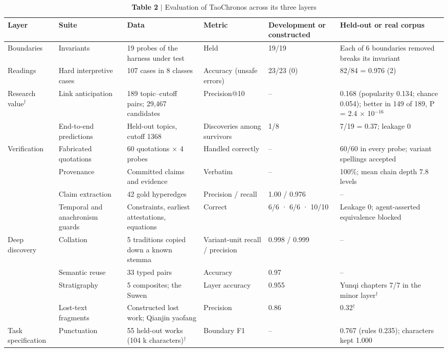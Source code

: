 \begin{table}[t]
\small
\caption{\textbf{Table 2} $|$ Evaluation of TaoChronos across its three layers}
\begin{tabular}{llllll}
\toprule
Layer & Suite & Data & Metric & Development or constructed & Held-out or real corpus \\
\midrule
Boundaries & Invariants & 19 probes of the harness under test & Held & 19/19 & Each of 6 boundaries removed breaks its invariant \\
Readings & Hard interpretive cases & 107 cases in 8 classes & Accuracy (unsafe errors) & 23/23 (0) & 82/84 = 0.976 (2) \\
Research value$^{\dagger}$ & Link anticipation & 189 topic–cutoff pairs; 29,467 candidates & Precision@10 & – & 0.168 (popularity 0.134; chance 0.054); better in 149 of 189, P = 2.4 $\times$ 10$^{-16}$ \\
 & End-to-end predictions & Held-out topics, cutoff 1368 & Discoveries among survivors & 1/8 & 7/19 = 0.37; leakage 0 \\
Verification & Fabricated quotations & 60 quotations $\times$ 4 probes & Handled correctly & – & 60/60 in every probe; variant spellings accepted \\
 & Provenance & Committed claims and evidence & Verbatim & – & 100\%; mean chain depth 7.8 levels \\
 & Claim extraction & 42 gold hyperedges & Precision / recall & 1.00 / 0.976 & – \\
 & Temporal and anachronism guards & Constraints, earliest attestations, equations & Correct & 6/6 · 6/6 · 10/10 & Leakage 0; agent-asserted equivalence blocked \\
Deep discovery & Collation & 5 traditions copied down a known stemma & Variant-unit recall / precision & 0.998 / 0.999 & – \\
 & Semantic reuse & 33 typed pairs & Accuracy & 0.97 & – \\
 & Stratigraphy & 5 composites; the Suwen & Layer accuracy & 0.955 & Yunqi chapters 7/7 in the minor layer$^{\dagger}$ \\
 & Lost-text fragments & Constructed lost work; Qianjin yaofang & Precision & 0.86 & 0.32$^{\dagger}$ \\
Task specification & Punctuation & 55 held-out works (104 k characters)$^{\dagger}$ & Boundary F1 & – & 0.767 (rules 0.235); characters kept 1.000 \\

\end{tabular}
\end{table}
